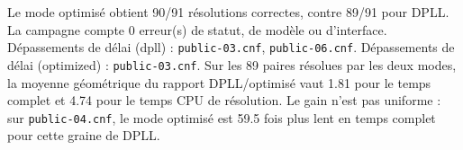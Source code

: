 Le mode optimisé obtient 90/91 résolutions correctes, contre 89/91 pour DPLL. La campagne compte 0 erreur(s) de statut, de modèle ou d'interface.
Dépassements de délai (dpll) : \texttt{public-03.cnf}, \texttt{public-06.cnf}.
Dépassements de délai (optimized) : \texttt{public-03.cnf}.
Sur les 89 paires résolues par les deux modes, la moyenne géométrique du rapport DPLL/optimisé vaut 1.81 pour le temps complet et 4.74 pour le temps CPU de résolution.
Le gain n'est pas uniforme : sur \texttt{public-04.cnf}, le mode optimisé est 59.5 fois plus lent en temps complet pour cette graine de DPLL.
